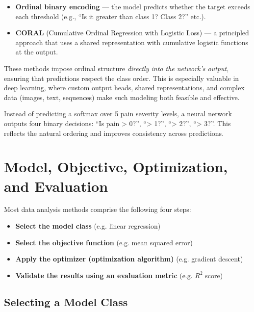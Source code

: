 \documentclass[12pt,openany]{book}
\begin{document}
\begin{itemize}
    \item \textbf{Ordinal binary encoding} — the model predicts whether the target exceeds each threshold (e.g., ``Is it greater than class 1? Class 2?'' etc.).
    \item \textbf{CORAL} (Cumulative Ordinal Regression with Logistic Loss) — a principled approach that uses a shared representation with cumulative logistic functions at the output.
\end{itemize}

These methods impose ordinal structure \emph{directly into the network’s output}, ensuring that predictions respect the class order. This is especially valuable in deep learning, where custom output heads, shared representations, and complex data (images, text, sequences) make such modeling both feasible and effective.

\begin{examplebox}
Instead of predicting a softmax over 5 pain severity levels, a neural network outputs four binary decisions: “Is pain \textgreater{} 0?”, “\textgreater{} 1?”, “\textgreater{} 2?”, “\textgreater{} 3?”. This reflects the natural ordering and improves consistency across predictions.
\end{examplebox}

\vspace{10pt}




\chapter{Model, Objective, Optimization, and Evaluation}

Most data analysis methods comprise the following four steps:
\begin{itemize}
    \item \textbf{Select the model class} (e.g. linear regression)
    \item \textbf{Select the objective function} (e.g. mean squared error)
    \item \textbf{Apply the optimizer (optimization algorithm)} (e.g. gradient descent)
    \item \textbf{Validate the results using an evaluation metric} (e.g. $R^2$ score)
\end{itemize}



\section{Selecting a Model Class}
\end{document}
